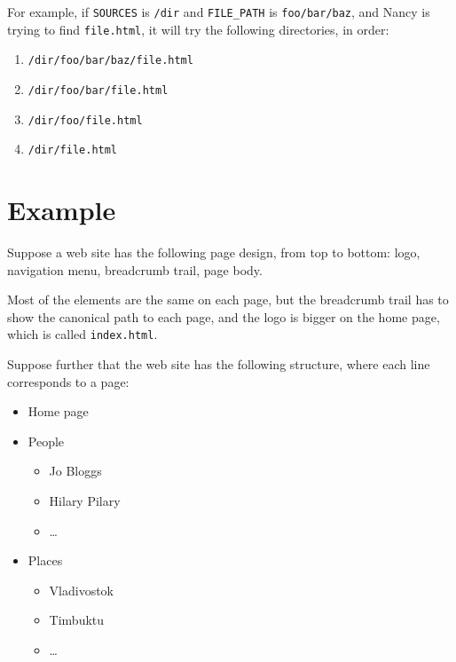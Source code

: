 \documentclass[english]{scrartcl}
\begin{document}
For example, if \verb|SOURCES| is \verb|/dir| and \verb|FILE_PATH| is \verb|foo/bar/baz|, and Nancy is trying to find \verb|file.html|, it will try the following directories, in order:

\begin{enumerate}
\item \verb|/dir/foo/bar/baz/file.html|
\item \verb|/dir/foo/bar/file.html|
\item \verb|/dir/foo/file.html|
\item \verb|/dir/file.html|
\end{enumerate}

\section{Example}

Suppose a web site has the following page design, from top to bottom: logo, navigation menu, breadcrumb trail, page body.

Most of the elements are the same on each page, but the breadcrumb trail has to show the canonical path to each page, and the logo is bigger on the home page, which is called \verb|index.html|.

Suppose further that the web site has the following structure, where each line corresponds to a page:

\begin{itemize}
\item Home page
\item People
  \begin{itemize}
  \item Jo Bloggs
  \item Hilary Pilary
  \item \dots
  \end{itemize}
\item Places
  \begin{itemize}
  \item Vladivostok
  \item Timbuktu
  \item \dots
  \end{itemize}
\end{itemize}
\end{document}
